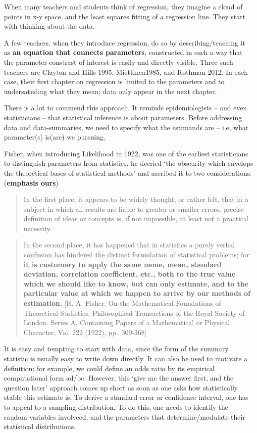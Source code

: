\documentclass[]{book}
\begin{document}
When many teachers and students think of regression, they imagine a cloud of points in x-y space, and the least squares fitting of a regression line. They start with thinking about the data.

A few teachers, when they introduce regression, do so by describing/teaching it as \textbf{an equation that connects parameters}, constructed in such a way that the parameter-constrast of interest is easily and directly visible. Three such teachers are Clayton and Hills 1995, Miettinen1985, and Rothman 2012. In each case, their first chapter on regression is limited to the parameters and to undersatnding what they mean; data only appear in the next chapter.

There is a lot to commend this approach. It reminds epidemiologists -- and even statisticians -- that statistical inference is about parameters. Before addressing data and data-summaries, we need to specify what the estimands are -- i.e, what parameter(s) is(are) we pursuing.

Fisher, when introducing Likelihood in 1922, was one of the earliest statisticians to distinguish parameters from statistics. he decried `the obscurity which envelops the theoretical bases of statistical methods' and ascribed it to two considerations. (\textbf{emphasis ours})

\begin{quote}
In the first place, it appears to be widely thought, or rather felt, that in a subject in which all results are liable to greater or smaller errors, precise definition of ideas or concepts is, if not impossible, at least not a practical necessity.
\end{quote}

\begin{quote}
In the second place, it has happened that in statistics a purely verbal confusion has hindered the distinct formulation of statistical problems; for \textbf{it is customary to apply the same name, mean, standard deviation, correlation coefficient, etc., both to the true value which we should like to know, but can only estimate, and to the particular value at which we happen to arrive by our methods of estimation.} {[}R. A. Fisher. On the Mathematical Foundations of Theoretical Statistics. Philosophical Transactions of the Royal Society of London. Series A, Containing Papers of a Mathematical or Physical Character, Vol. 222 (1922), pp.~309-368{]}
\end{quote}

It is easy and tempting to start with data, since the form of the summary statistic is usually easy to write down directly. It can also be used to motivate a definition: for example, we could define an odds ratio by its empirical computational form ad/bc. However, this `give me the answer first, and the question later' approach comes up short as soon as one asks how statistically stable this estimate is. To derive a standard error or confidence interval, one has to appeal to a sampling distribution. To do this, one needs to identify the random variables involvced, and the parameters that determine/modulate their statistical distributions.
\end{document}
